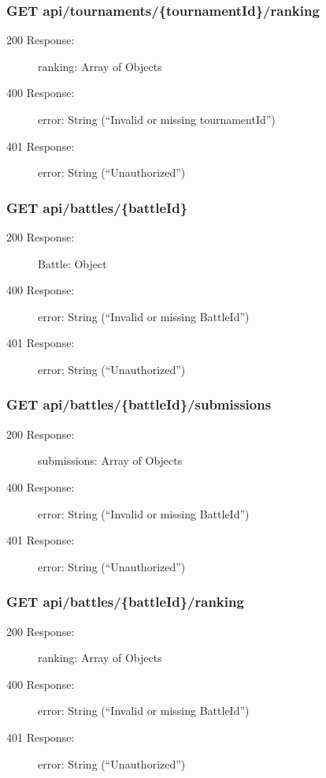 \documentclass{Configuration_Files/Template}
\begin{document}
\subsubsection{GET api/tournaments/\{tournamentId\}/ranking}
\begin{description}
    \item[200 Response:] ranking: Array of Objects
    \item[400 Response:] error: String (“Invalid or missing tournamentId”)
    \item[401 Response:] error: String (“Unauthorized”)
\end{description}

\subsubsection{GET api/battles/\{battleId\}}
\begin{description}
    \item[200 Response:] Battle: Object
    \item[400 Response:] error: String (“Invalid or missing BattleId”)
    \item[401 Response:] error: String (“Unauthorized”)
\end{description}

\subsubsection{GET api/battles/\{battleId\}/submissions}
\begin{description}
    \item[200 Response:] submissions: Array of Objects
    \item[400 Response:] error: String (“Invalid or missing BattleId”)
    \item[401 Response:] error: String (“Unauthorized”)
\end{description}

\subsubsection{GET api/battles/\{battleId\}/ranking}
\begin{description}
    \item[200 Response:] ranking: Array of Objects
    \item[400 Response:] error: String (“Invalid or missing BattleId”)
    \item[401 Response:] error: String (“Unauthorized”)
\end{description}
\end{document}
